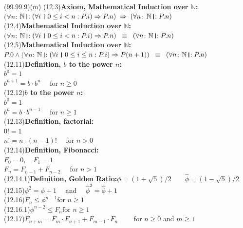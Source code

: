 \documentclass{amsart}
\newcommand{\lgap}{2pt}                             %
\newcommand{\equivss}{\ensuremath{\;\;\equiv\;\;}}  %
\newcommand{\impl}{\ensuremath{\Rightarrow}}        %
\newcommand{\thedr}{\rule[-.25ex]{.32mm}{1.75ex}}   %
\newcommand{\dr}{\;\,\thedr\,\;}                    %
\newcommand{\rb}{:}                                 %
\newcommand{\drrb}{\;\thedr\,{:}\;}                 %
\newcommand{\all}{\forall}                          %
\begin{document}
\begin{tabbing}
(99.99.9)\;\=(m)\;\=\kill
(12.3)\>\textbf{Axiom, Mathematical Induction over $\mathbb{N}$:}\\[\lgap]
          \>$(\all n$: $\mathbb{N}\drrb (\all i\dr 0\le i < n\rb P.i)\impl P.n) \; \impl \; (\all n$: $\mathbb{N}\drrb P.n)$\\[\lgap]
(12.4)\>\textbf{Mathematical Induction over $\mathbb{N}$:}\\[\lgap]
          \>$(\all n$: $\mathbb{N}\drrb (\all i\dr 0\le i < n\rb P.i)\impl P.n) \equivss (\all n$: $\mathbb{N}\drrb P.n)$\\[\lgap]
(12.5)\>\textbf{Mathematical Induction over $\mathbb{N}$:}\\[\lgap]
          \>$P.0\land (\all n$: $\mathbb{N}\drrb (\all i\dr 0\le i \le n\rb P.i)\impl P(n+1)) \equivss (\all n$: $\mathbb{N}\drrb P.n)$\\[\lgap]
(12.11)\>\textbf{Definition, $b$ to the power $n$:}\\[\lgap]
           \>$b^{0} = 1$\\[\lgap]
           \>$b^{n+1} = b\cdot b^{n}\quad$ for $ n\ge 0$\\[\lgap]
(12.12)\>\textbf{$b$ to the power $n$:}\\[\lgap]
           \>$b^{0} = 1$\\[\lgap]
           \>$b^{n} = b\cdot b^{n-1}\quad$ for $ n\ge 1$\\[\lgap]
(12.13)\>\textbf{Definition, factorial:}\\[\lgap]
           \>$0! = 1$\\[\lgap]
           \>$n! = n\cdot (n-1)!\quad $ for $n > 0$\\[\lgap]
(12.14)\>\textbf{Definition, Fibonacci:}\\[\lgap]
           \>$F_{0} = 0,\quad F_{1}=1$\\[\lgap]
           \>$F_{n} = F_{n-1} + F_{n-2}\quad$ for $n > 1$\\[\lgap]
(12.14.1)\>\textbf{Definition, Golden Ratio:}\quad $\phi = (1 + \sqrt{5})/2\quad \quad \hat{\phi} = (1 - \sqrt{5})/2$\\[\lgap]
(12.15)\>$\phi^{2} = \phi + 1\quad$ and $\quad \hat{\phi}^{2} = \hat{\phi} + 1$\\[\lgap]
(12.16)\>$F_{n}\le \phi^{n-1}$\quad for $n\ge 1$\\[\lgap]
(12.16.1)\>$\phi^{n-2}\le F_{n}$\quad for $n\ge 1$\\[\lgap]
(12.17)\>$F_{n+m} = F_{m}\cdot F_{n+1} + F_{m-1}\cdot F_{n}\quad \quad$ for $n\ge 0$ and $m\ge 1$\\[\lgap]
\end{tabbing}
\end{document}

